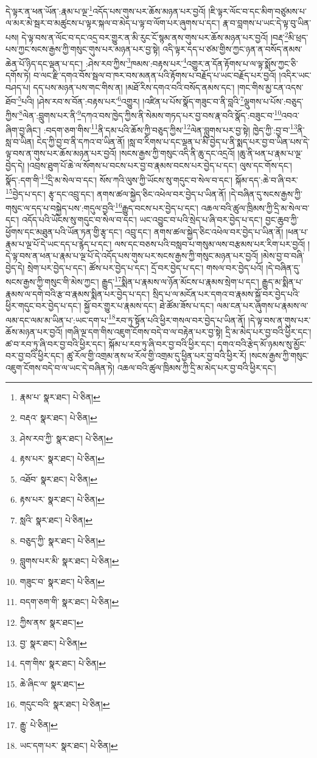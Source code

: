 དེ་ལྟར་ན་ཕན་ཡོན་:རྣམ་པ་ལྔ་\footnote{རྣམ་པ་  སྣར་ཐང་།  པེ་ཅིན། }འདོད་པས་གུས་པར་ཆོས་མཉན་པར་བྱའོ། །ཇི་ལྟར་ལོང་བ་དང་མིག་བཙུམས་པ་ལ་མར་མེ་སྦར་བ་མཚུངས་པ་ལྟར་སྐལ་བ་མེད་པ་ལྟ་བ་ལོག་པར་ཞུགས་པ་དང་། རྣ་བ་བླགས་པ་ཡང་དེ་ལྟ་བུ་ཡིན་པས། དེ་ལྟ་བས་ན་ལོང་བ་དང་འདྲ་བར་གྱུར་ན་མི་རུང་ངོ་སྙམ་ནས་གུས་པར་ཆོས་མཉན་པར་བྱའོ། །བརྡ་\footnote{བརྡའ་  སྣར་ཐང་།  པེ་ཅིན། }མི་ཕྲད་པས་ཀྱང་སངས་རྒྱས་ཀྱི་གསུང་གུས་པར་མཉན་པར་བྱ་སྟེ། འདི་ལྟར་དད་པ་ཙམ་གྱིས་ཀྱང་ཉན་ན་བསོད་ནམས་ཆེན་པོ་ཉིད་དང་ལྡན་པ་དང་། :ཤེས་རབ་ཀྱིས་\footnote{ཤེས་རབ་ཀྱི་  སྣར་ཐང་།  པེ་ཅིན། }ཁམས་:བརྟས་པར་\footnote{རྟས་པར་  སྣར་ཐང་།  པེ་ཅིན། }འགྱུར་ན་དོན་རྟོགས་པ་ལ་ལྟ་སྨོས་ཀྱང་ཅི་དགོས་ཏེ། བ་ལང་རྫི་དགའ་བོས་སྦལ་བ་ཁར་བས་མནན་པའི་རྟོགས་པ་བརྗོད་པ་ཡང་བརྗོད་པར་བྱའོ། །འདིར་ཡང་བཤད་པ། དད་པས་མཉན་པས་གང་གིས་ན། །མཐོ་རིས་དགའ་བའི་བསོད་ནམས་དང་། །གང་གིས་མྱ་ངན་འདས་ཐོབ་\footnote{འཐོབ་  སྣར་ཐང་།  པེ་ཅིན། }པའི། །ཤེས་རབ་ས་བོན་:བརྟས་པར་\footnote{རྟས་པར་  སྣར་ཐང་།  པེ་ཅིན། }འགྱུར། །འཛིན་པ་པོས་སྣོད་གཟུང་བ་ནི་བླའི་\footnote{སླའི་  སྣར་ཐང་།  པེ་ཅིན། }ལྡུགས་པ་པོས་:བཅུད་ཀྱིས་\footnote{བཅུད་ཀྱི་  སྣར་ཐང་།  པེ་ཅིན། }ལེན་:བླུགས་པར་ནི་\footnote{བླུགས་པར་མི་  སྣར་ཐང་།  པེ་ཅིན། }དཀའ་བས་ཁྱེད་ཀྱིས་ནི་སེམས་གཏད་པར་བྱ་བས་རྣ་བའི་སྣོད་:བཟུང་བ་\footnote{གཟུང་བ་  སྣར་ཐང་།  པེ་ཅིན། }འབའ་ཞིག་བྱ་ཞིང་། :བདག་ཅག་གིས་\footnote{བདག་ཅག་གི་  སྣར་ཐང་།  པེ་ཅིན། }ནི་དམ་པའི་ཆོས་ཀྱི་བཅུད་ཀྱིས་\footnote{ཀྱིས་ནས་  སྣར་ཐང་། }ལེན་བླུགས་པར་བྱ་སྟེ། ཁྱེད་ཀྱི་:བྱ་བ་\footnote{བྱ་  སྣར་ཐང་།  པེ་ཅིན། }ནི་སླ་བ་ཡིན། ངེད་ཀྱི་བྱ་བ་ནི་དཀའ་བ་ཡིན་ནོ། །སླ་བ་རིགས་པ་དང་ལྡན་པ་མི་བྱེད་པ་ནི་སྨད་པར་བྱ་བ་ཡིན་པས་དེ་ལྟ་བས་ན་གུས་པར་ཆོས་མཉན་པར་བྱའོ། །སངས་རྒྱས་ཀྱི་གསུང་འདི་ནི་ཆུ་དང་འདྲའོ། །ཆུ་ནི་ཕན་པ་རྣམ་པ་ལྔ་བྱེད་དེ། །འབྲས་ཐུག་པོ་ཆེ་ལ་སོགས་པ་བངས་པར་བྱ་བ་རྣམས་བངས་པར་བྱེད་པ་དང་། ལུས་དང་གོས་དང་། སྣོད་:དག་གི་\footnote{དག་གིས་  སྣར་ཐང་།  པེ་ཅིན། }དྲི་མ་སེལ་བ་དང་། སོས་ཀའི་ལུས་ཀྱི་ཡོངས་སུ་གདུང་བ་སེལ་བ་དང་། སྐོམ་དད་:ཆེ་བ་ཞི་བར་\footnote{ཆེ་ཞིང་ལ་  སྣར་ཐང་། }བྱེད་པ་དང་། རྩྭ་དང་འབྲུ་དང་། ནགས་ཚལ་སྐྱེད་ཅིང་འཕེལ་བར་བྱེད་པ་ཡིན་ནོ། །དེ་བཞིན་དུ་སངས་རྒྱས་ཀྱི་གསུང་ལ་དད་པ་བསྐྱེད་པས་:གདུལ་བྱའི་\footnote{གདུང་བའི་  སྣར་ཐང་།  པེ་ཅིན། }རྒྱུད་བངས་པར་བྱེད་པ་དང་། འཆལ་བའི་ཚུལ་ཁྲིམས་ཀྱི་དྲི་མ་སེལ་བ་དང་། འདོད་པའི་ཡོངས་སུ་གདུང་བ་སེལ་བ་དང་། ཡང་འབྱུང་བ་པའི་སྲེད་པ་ཞི་བར་བྱེད་པ་དང་། བྱང་ཆུབ་ཀྱི་ཕྱོགས་དང་མཐུན་པའི་ཡོན་ཏན་གྱི་རྩྭ་དང་། འབྲུ་དང་། ནགས་ཚལ་སྐྱེད་ཅིང་འཕེལ་བར་བྱེད་པ་ཡིན་ནོ། །ཕན་པ་རྣམ་པ་ལྔ་པོ་དེ་ཡང་དད་པ་རྙེད་པ་དང་། ལས་དང་བཅས་པའི་བསླབ་པ་གསུམ་ལས་བརྩམས་པར་རིག་པར་བྱའོ། །དེ་ལྟ་བས་ན་ཕན་པ་རྣམ་པ་ལྔ་པོ་དེ་འདོད་པས་གུས་པར་སངས་རྒྱས་ཀྱི་གསུང་མཉན་པར་བྱའོ། །མེས་བྱ་བ་བཞི་བྱེད་དེ། སྲེག་པར་བྱེད་པ་དང་། ཚོས་པར་བྱེད་པ་དང་། དྲོ་བར་བྱེད་པ་དང་། གསལ་བར་བྱེད་པའོ། །དེ་བཞིན་དུ་སངས་རྒྱས་ཀྱི་གསུང་གི་མེས་ཀྱང་། རྒྱུད་\footnote{རྒྱུ་  པེ་ཅིན། }སྨིན་པ་རྣམས་ལ་ཉོན་མོངས་པ་རྣམས་སྲེག་པ་དང་། རྒྱུད་མ་སྨིན་པ་རྣམས་ལ་དགེ་བའི་རྩ་བ་རྣམས་སྨིན་པར་བྱེད་པ་དང་། སྲིད་པ་ལ་མངོན་པར་དགའ་བ་རྣམས་སྐྱོ་བར་བྱེད་པའི་ཕྱིར་གདུང་བར་བྱེད་པ་དང་། སྐྱོ་བར་གྱུར་པ་རྣམས་དང་། ཐེ་ཚོམ་ཟོས་པ་དང་། ལམ་ངན་པར་ཞུགས་པ་རྣམས་ལ་ལམ་དང་ལམ་མ་ཡིན་པ་:ཡང་དག་པ་\footnote{ཡང་དག་པར་  སྣར་ཐང་།  པེ་ཅིན། }རབ་ཏུ་སྟོན་པའི་ཕྱིར་གསལ་བར་བྱེད་པ་ཡིན་ནོ། །དེ་ལྟ་བས་ན་གུས་པར་ཆོས་མཉན་པར་བྱའོ། །གཞི་ལྔ་དག་གིས་འཇུག་ངོགས་བདེ་བ་ལ་བརྟེན་པར་བྱ་སྟེ། དྲི་མ་མེད་པར་བྱ་བའི་ཕྱིར་དང་། ཚ་བ་རབ་ཏུ་ཞི་བར་བྱ་བའི་ཕྱིར་དང་། སྐོམ་པ་རབ་ཏུ་ཞི་བར་བྱ་བའི་ཕྱིར་དང་། དགའ་བའི་རྩེད་མོ་ཉམས་སུ་མྱོང་བར་བྱ་བའི་ཕྱིར་དང་། ཚུ་རོལ་གྱི་འགྲམ་ནས་ཕ་རོལ་གྱི་འགྲམ་དུ་ཕྱིན་པར་བྱ་བའི་ཕྱིར་རོ། །སངས་རྒྱས་ཀྱི་གསུང་འཇུག་ངོགས་བདེ་བ་ལ་ཡང་དེ་བཞིན་ཏེ། འཆལ་བའི་ཚུལ་ཁྲིམས་ཀྱི་དྲི་མ་མེད་པར་བྱ་བའི་ཕྱིར་དང་། 